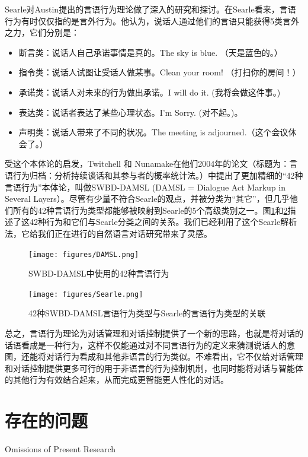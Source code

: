Searle对Austin提出的言语行为理论做了深入的研究和探讨。在Searle\cite{Searle1969}看来，言语行为有时仅仅指的是言外行为。他认为，说话人通过他们的言语只能获得5类言外之力，它们分别是：

\begin{itemize}
\item 断言类：说话人自己承诺事情是真的。The sky is blue. （天是蓝色的。）
\item 指令类：说话人试图让受话人做某事。Clean your room! （打扫你的房间！）
\item 承诺类：说话人对未来的行为做出承诺。I will do it. (我将会做这件事。)
\item 表达类：说话者表达了某些心理状态。I’m Sorry. (对不起。)。
\item 声明类：说话人带来了不同的状况。The meeting is adjourned.（这个会议休会了。）
\end{itemize}

受这个本体论的启发，Twitchell 和 Nunamake在他们2004年的论文（标题为：言语行为归档：分析持续谈话和其参与者的概率统计法。\cite{Twitchell2004}）中提出了更加精细的“42种言语行为”本体论，叫做SWBD-DAMSL (DAMSL = Dialogue Act Markup in Several Layers）。尽管有少量不符合Searle的观点，并被分类为“其它”，但几乎他们所有的42种言语行为类型都能够被映射到Searle的5个高级类别之一。图\ref{fig:DAMSL}和\ref{fig:Searle}描述了这42种行为和它们与Searle分类之间的关系。我们已经利用了这个Searle解析法，它给我们正在进行的自然语言对话研究带来了灵感。

\begin{figure}[htb]
\centering
\texttt{[image: figures/DAMSL.png]}
\caption{SWBD-DAMSL中使用的42种言语行为}
\label{fig:DAMSL}
\end{figure}

\begin{figure}[htb]
\centering
\texttt{[image: figures/Searle.png]}
\caption{ 42种SWBD-DAMSL言语行为类型与Searle的言语行为类型的关联}
\label{fig:Searle}
\end{figure}


总之，言语行为理论为对话管理和对话控制提供了一个新的思路，也就是将对话的话语看成是一种行为，这样不仅能通过对不同言语行为的定义来猜测说话人的意图，还能将对话行为看成和其他非语言的行为类似。不难看出，它不仅给对话管理和对话控制提供更多可行的用于非语言的行为控制机制，也同时能将对话与智能体的其他行为有效结合起来，从而完成更智能更人性化的对话。

\section{存在的问题}{Omissions of Present Research}

